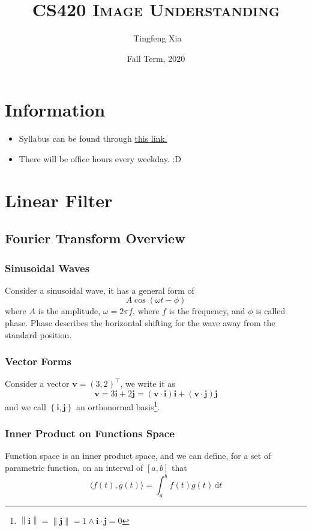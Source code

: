 \documentclass[11pt]{article}
\author{\ccLogo \,\,Tingfeng Xia}
\title{\textsc{CS420 Image Understanding}}
\date{Fall Term, 2020}
\newcommand{\bi}{\mathbf{i}}
\newcommand{\bj}{\mathbf{j}}
\newcommand{\bv}{\mathbf{v}}
\newcommand{\norm}[1]{\left\lVert#1\right\rVert}
\begin{document}
\maketitle
\doclicenseThis
\section*{Information}
\begin{itemize}
	\item Syllabus can be found through \href{https://q.utoronto.ca/courses/181228/files/8680178/preview}{this link. }
	\item There will be office hours every weekday. :D
\end{itemize}
\tableofcontents
\newpage
\section{Linear Filter}
\subsection{Fourier Transform Overview}
\subsubsection{Sinusoidal Waves\label{sec:sinwaves}}
Consider a sinusoidal wave, it has a general form of
\begin{equation}
	A\cos \left( \omega t - \phi \right)
\end{equation}
where $A$ is the amplitude, $\omega = 2\pi f$, where $f$ is the frequency, and $\phi$ is called phase. Phase describes the horizontal shifting for the wave away from the standard position. 

\subsubsection{Vector Forms}
Consider a vector $\bv = \left( 3, 2 \right)^\top$, we write it as 
\begin{equation}
	\bv = 3\bi + 2\bj = (\bv \cdot \bi) \bi + (\bv \cdot \bj) \bj
\end{equation}
and we call $\left\{ \bi, \bj \right\}$ an orthonormal basis\footnote{$\norm{\bi} = \norm{\bj} = 1 \wedge \bi \cdot \bj = 0$}. 

\subsubsection{Inner Product on Functions Space}
Function space is an inner product space, and we can define, for a set of parametric function, on an interval of $[a, b]$ that 
\begin{equation}
	\langle f(t), g(t) \rangle = \int_a^b f(t)g(t) \,\mathrm{d} t
\end{equation}
\end{document}
